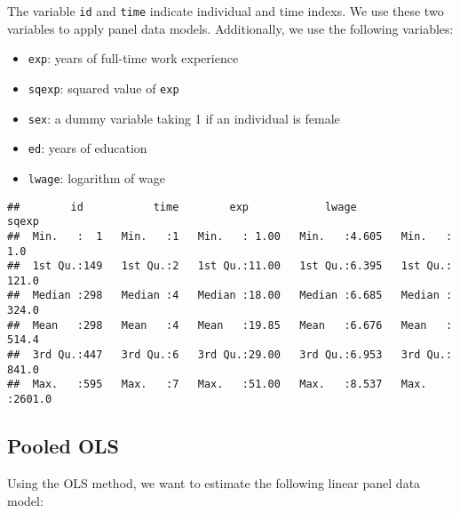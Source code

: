 \documentclass[
  12pt,
]{article}
\newenvironment{Shaded}{\begin{snugshade}}{\end{snugshade}}
\newcommand{\DecValTok}[1]{\textcolor[rgb]{0.00,0.00,0.81}{#1}}
\newcommand{\FunctionTok}[1]{\textcolor[rgb]{0.00,0.00,0.00}{#1}}
\newcommand{\NormalTok}[1]{#1}
\newcommand{\OtherTok}[1]{\textcolor[rgb]{0.56,0.35,0.01}{#1}}
\newcommand{\SpecialCharTok}[1]{\textcolor[rgb]{0.00,0.00,0.00}{#1}}
\newcommand{\StringTok}[1]{\textcolor[rgb]{0.31,0.60,0.02}{#1}}
\providecommand{\tightlist}{%
  \setlength{\itemsep}{0pt}\setlength{\parskip}{0pt}}
\begin{document}
The variable \texttt{id} and \texttt{time} indicate individual and time
indexs. We use these two variables to apply panel data models.
Additionally, we use the following variables:

\begin{itemize}
\tightlist
\item
  \texttt{exp}: years of full-time work experience
\item
  \texttt{sqexp}: squared value of \texttt{exp}
\item
  \texttt{sex}: a dummy variable taking 1 if an individual is female
\item
  \texttt{ed}: years of education
\item
  \texttt{lwage}: logarithm of wage
\end{itemize}

\begin{Shaded}
\end{Shaded}

\begin{verbatim}
##        id           time        exp            lwage           sqexp       
##  Min.   :  1   Min.   :1   Min.   : 1.00   Min.   :4.605   Min.   :   1.0  
##  1st Qu.:149   1st Qu.:2   1st Qu.:11.00   1st Qu.:6.395   1st Qu.: 121.0  
##  Median :298   Median :4   Median :18.00   Median :6.685   Median : 324.0  
##  Mean   :298   Mean   :4   Mean   :19.85   Mean   :6.676   Mean   : 514.4  
##  3rd Qu.:447   3rd Qu.:6   3rd Qu.:29.00   3rd Qu.:6.953   3rd Qu.: 841.0  
##  Max.   :595   Max.   :7   Max.   :51.00   Max.   :8.537   Max.   :2601.0
\end{verbatim}

\hypertarget{pooled-ols}{%
\subsection{Pooled OLS}\label{pooled-ols}}

Using the OLS method, we want to estimate the following linear panel
data model:
\end{document}
